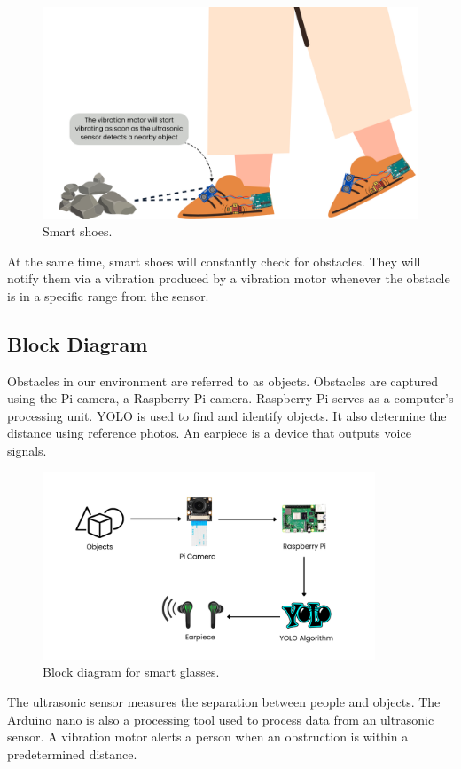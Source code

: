 \documentclass[conference]{IEEEtran}
\begin{document}
\begin{figure}[h]
\centering
\includegraphics[width=3in\textwidth]{graphic_lower_300_DPI.png}
\caption{Smart shoes.}
\label{fig_sim}
\end{figure}

At the same time, smart shoes will constantly check for obstacles. They will notify them via a vibration produced by a vibration motor whenever the obstacle is in a specific range from the sensor.

\subsection{Block Diagram}

Obstacles in our environment are referred to as objects. Obstacles are captured using the Pi camera, a Raspberry Pi camera. Raspberry Pi serves as a computer's processing unit. YOLO is used to find and identify objects. It also determine the distance using reference photos. An earpiece is a device that outputs voice signals.

\begin{figure}[h]
\centering
\includegraphics[width=3.7in\textwidth, height=2.2in]{block_upper_300_DPI.png}
\caption{Block diagram for smart glasses.}
\label{fig_sim}
\end{figure}

 The ultrasonic sensor measures the separation between people and objects. The Arduino nano is also a processing tool used to process data from an ultrasonic sensor. A vibration motor alerts a person when an obstruction is within a predetermined distance. 
 
\end{document}
